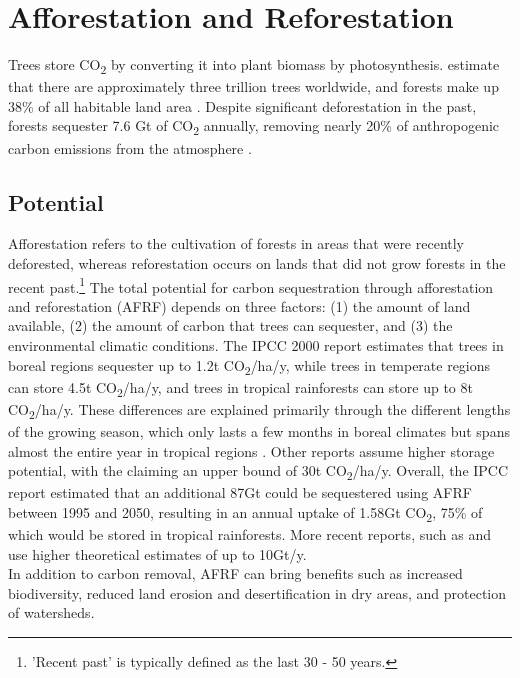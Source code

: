 \section{Afforestation and Reforestation}
Trees store CO\textsubscript{2} by converting it into plant biomass by photosynthesis. \textcite{Crowther2015MappingScale} estimate that there are approximately three trillion trees worldwide, and forests make up 38\% of all habitable land area \parencite{RitchieHowForested}. Despite significant deforestation in the past, forests sequester 7.6 Gt of CO\textsubscript{2} annually, removing nearly 20\% of anthropogenic carbon emissions from the atmosphere \parencite{Harris2021GlobalFluxes}.
\subsection*{Potential}
Afforestation refers to the cultivation of forests in areas that were recently deforested, whereas reforestation occurs on lands that did not grow forests in the recent past.\footnote{'Recent past' is typically defined as the last 30 - 50 years.} The total potential for carbon sequestration through afforestation and reforestation (AFRF) depends on three factors: (1) the amount of land available, (2) the amount of carbon that trees can sequester, and (3) the environmental climatic conditions.
The IPCC 2000 report estimates that trees in boreal regions sequester up to 1.2t CO\textsubscript{2}/ha/y, while trees in temperate regions can store 4.5t CO\textsubscript{2}/ha/y, and trees in tropical rainforests can store up to 8t CO\textsubscript{2}/ha/y. These differences are explained primarily through the different lengths of the growing season, which only lasts a few months in boreal climates but spans almost the entire year in tropical regions \parencite{Watson2000LandForestry}. Other reports assume higher storage potential, with the \textcite{NAS2018NegativeAgenda} claiming an upper bound of 30t CO\textsubscript{2}/ha/y. Overall, the IPCC report estimated that an additional 87Gt could be sequestered using AFRF between 1995 and 2050, resulting in an annual uptake of 1.58Gt CO\textsubscript{2}, 75\% of which would be stored in tropical rainforests. More recent reports, such as \textcite{Fuss2018NegativeEffects} and \textcite{Griscom2017NaturalSolutions} use higher theoretical estimates of up to 10Gt/y.\\
In addition to carbon removal, AFRF can bring benefits such as increased biodiversity, reduced land erosion and desertification in dry areas, and protection of watersheds. \parencite{Watson2000LandForestry}
